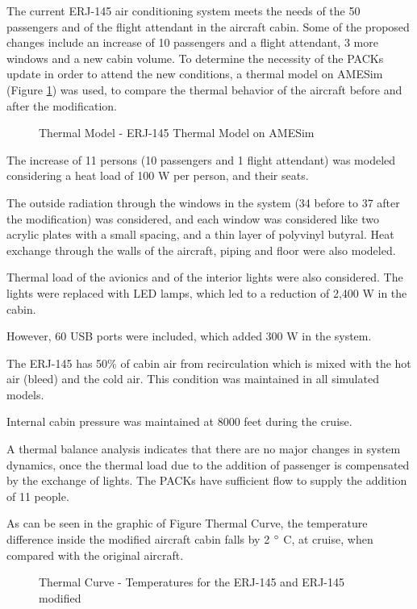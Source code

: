 The current ERJ-145 air conditioning system meets the needs of the 50 passengers and of the flight attendant in the aircraft cabin.
Some of the proposed changes include an increase of 10 passengers and a flight attendant, 3 more windows and a new cabin volume.
To determine the necessity of the PACKs update in order to attend the new conditions, a thermal model on AMESim (Figure \ref{fig:thermalmodel}) was used, to compare the thermal behavior of the aircraft before and after the modification.

 \begin{figure}[H] %
\caption{Thermal Model - ERJ-145 Thermal Model on AMESim}
\label{fig:thermalmodel}
\end{figure}

The increase of 11 persons (10 passengers and 1 flight attendant) was modeled considering a heat load of 100 W per person, and their seats.

The outside radiation through the windows in the system (34 before to 37 after the modification) was considered, and each window was considered like two acrylic plates with a small spacing, and a thin layer of polyvinyl butyral.
Heat exchange through the walls of the aircraft, piping and floor were also modeled.

Thermal load of the avionics and of the interior lights were also considered. The lights were replaced with LED lamps, which led to a reduction of 2,400 W in the cabin.

However, 60 USB ports were included, which added 300 W in the system.

The ERJ-145 has 50\% of cabin air from recirculation which is mixed with the hot air (bleed) and the cold air. This condition was maintained in all simulated models.

Internal cabin pressure was maintained at 8000 feet during the cruise.

A thermal balance analysis indicates that there are no major changes in system dynamics, once the thermal load due to the addition of passenger is compensated by the exchange of lights. The PACKs have sufficient flow to supply the addition of 11 people.

As can be seen in the graphic of Figure Thermal Curve, the temperature difference inside the  modified aircraft cabin falls by 2 $\degree$ C, at cruise, when compared with the original aircraft.

 \begin{figure}[H] %
\caption{Thermal Curve - Temperatures for the ERJ-145 and ERJ-145 modified}
\label{fig:thermalcurve}
\end{figure}


